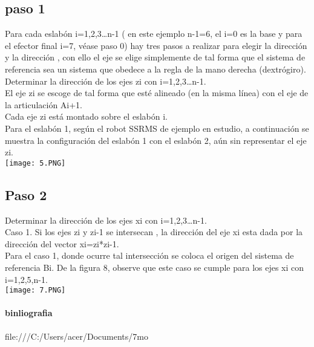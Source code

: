 \documentclass[12pt,a4paper]{article}
\begin{document}
\subsection{paso 1}
Para cada eslabón  i=1,2,3…n-1 ( en este ejemplo n-1=6, el i=0 es la base y para el efector final i=7, véase paso 0)  hay tres pasos a realizar para elegir la dirección  y la dirección , con ello el eje  se elige simplemente de tal forma que el sistema de referencia  sea un sistema que obedece a la regla de la mano derecha (dextrógiro).\\
Determinar la dirección de los ejes zi con i=1,2,3…n-1.\\
El eje zi se escoge de tal forma que esté alineado (en la misma línea) con el eje de la articulación Ai+1.\\
Cada eje zi está montado sobre el eslabón i.\\
Para el eslabón 1, según el robot SSRMS de ejemplo en estudio, a continuación se muestra la configuración del eslabón 1 con el eslabón 2, aún sin representar el eje zi.\\
\texttt{[image: 5.PNG]} \\
\subsection{Paso 2}
Determinar la dirección de los ejes xi con i=1,2,3…n-1.\\ Caso 1.
Si los ejes zi y zi-1 se intersecan , la dirección del eje xi esta dada por la dirección del vector xi=zi*zi-1.\\
Para el caso 1, donde ocurre tal intersección se coloca el origen del sistema de referencia Bi.
De la figura 8, observe que este caso se cumple para los ejes xi con i=1,2,5,n-1.\\
\texttt{[image: 7.PNG]} \\
\paragraph{binliografia}
file:///C:/Users/acer/Documents/7mo%
\end{document}

